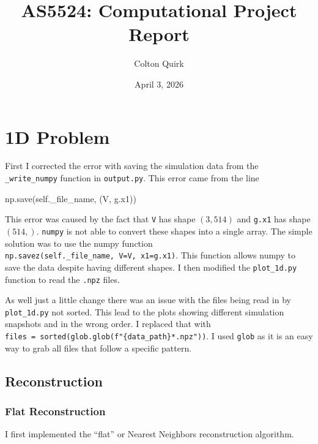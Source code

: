 \documentclass[
  letterpaper,
]{article}
\title{AS5524: Computational Project Report}
\author{Colton Quirk}
\date{April 3, 2026}
\newenvironment{Shaded}{\begin{snugshade}}{\end{snugshade}}
\newcommand{\NormalTok}[1]{\textcolor[rgb]{0.00,0.23,0.31}{#1}}
\newcommand{\VariableTok}[1]{\textcolor[rgb]{0.07,0.07,0.07}{#1}}
\renewcommand*\contentsname{Table of contents}
\newcommand\contentsname{Table of contents}
\begin{document}
\maketitle

\renewcommand*\contentsname{Table of contents}
{
\hypersetup{linkcolor=}
\setcounter{tocdepth}{3}
\tableofcontents
}

\section{1D Problem}\label{d-problem}

First I corrected the error with saving the simulation data from the
\texttt{\_write\_numpy} function in \texttt{output.py}. This error came
from the line

\begin{Shaded}
\begin{Highlighting}[]
\NormalTok{np.save(}\VariableTok{self}\NormalTok{.\_file\_name, (V, g.x1))}
\end{Highlighting}
\end{Shaded}

This error was caused by the fact that \texttt{V} has shape \((3, 514)\)
and \texttt{g.x1} has shape \((514,)\). \texttt{numpy} is not able to
convert these shapes into a single array. The simple solution was to use
the numpy function \texttt{np.savez(self.\_file\_name,\ V=V,\ x1=g.x1)}.
This function allows numpy to save the data despite having different
shapes. I then modified the \texttt{plot\_1d.py} function to read the
\texttt{.npz} files.

As well just a little change there was an issue with the files being
read in by \texttt{plot\_1d.py} not sorted. This lead to the plots
showing different simulation snapshots and in the wrong order. I
replaced that with
\texttt{files\ =\ sorted(glob.glob(f"\{data\_path\}*.npz"))}. I used
\texttt{glob} as it is an easy way to grab all files that follow a
specific pattern.

\subsection{Reconstruction}\label{reconstruction}

\subsubsection{Flat Reconstruction}\label{flat-reconstruction}

I first implemented the ``flat'' or Nearest Neighbors reconstruction
algorithm.
\end{document}
